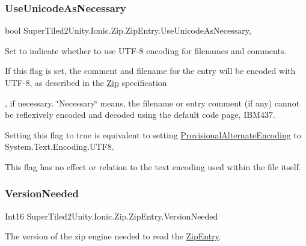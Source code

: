 \subsubsection{\texorpdfstring{Use\+Unicode\+As\+Necessary}{UseUnicodeAsNecessary}}
{\footnotesize\ttfamily bool Super\+Tiled2\+Unity.\+Ionic.\+Zip.\+Zip\+Entry.\+Use\+Unicode\+As\+Necessary\hspace{0.3cm}{\ttfamily [get]}, {\ttfamily [set]}}



Set to indicate whether to use U\+T\+F-\/8 encoding for filenames and comments. 

If this flag is set, the comment and filename for the entry will be encoded with U\+T\+F-\/8, as described in the \mbox{\hyperlink{namespace_super_tiled2_unity_1_1_ionic_1_1_zip}{Zip}} specification

, if necessary. \char`\"{}\+Necessary\char`\"{} means, the filename or entry comment (if any) cannot be reflexively encoded and decoded using the default code page, I\+B\+M437. 

Setting this flag to true is equivalent to setting \mbox{\hyperlink{class_super_tiled2_unity_1_1_ionic_1_1_zip_1_1_zip_entry_a29b5aae0611b60d5906ab25a1ed6c2f1}{Provisional\+Alternate\+Encoding}} to {\ttfamily System.\+Text.\+Encoding.\+U\+T\+F8}. 

This flag has no effect or relation to the text encoding used within the file itself. \mbox{\label{class_super_tiled2_unity_1_1_ionic_1_1_zip_1_1_zip_entry_a20cc898535b0cc01abc025d4678050be}} 
\subsubsection{\texorpdfstring{Version\+Needed}{VersionNeeded}}
{\footnotesize\ttfamily Int16 Super\+Tiled2\+Unity.\+Ionic.\+Zip.\+Zip\+Entry.\+Version\+Needed\hspace{0.3cm}{\ttfamily [get]}}



The version of the zip engine needed to read the \mbox{\hyperlink{class_super_tiled2_unity_1_1_ionic_1_1_zip_1_1_zip_entry}{Zip\+Entry}}. 

